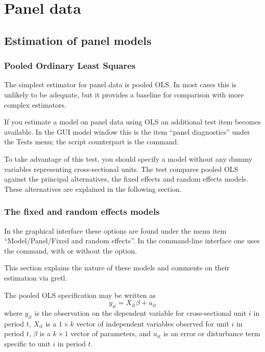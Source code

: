 \chapter{Panel data}
\label{chap:panel}

\section{Estimation of panel models}

\subsection{Pooled Ordinary Least Squares}
\label{pooled-est}

The simplest estimator for panel data is pooled OLS.  In most cases
this is unlikely to be adequate, but it provides a baseline for
comparison with more complex estimators.

If you estimate a model on panel data using OLS an additional test
item becomes available.  In the GUI model window this is the item
``panel diagnostics'' under the \textsf{Tests} menu; the script
counterpart is the  command.

To take advantage of this test, you should specify a model without any
dummy variables representing cross-sectional units.  The test compares
pooled OLS against the principal alternatives, the fixed effects and
random effects models.  These alternatives are explained in the
following section.

\subsection{The fixed and random effects models}
\label{sec:FE-vs-RE}

In the graphical interface these options are found under the menu item
``Model/Panel/Fixed and random effects''.  In the command-line
interface one uses the  command, with or without the
 option.

This section explains the nature of these models and comments on their
estimation via gretl.

The pooled OLS specification may be written as 
\begin{equation}
\label{eq:pooled}
y_{it} = X_{it}\beta + u_{it}
\end{equation}
where $y_{it}$ is the observation on the dependent variable for
cross-sectional unit $i$ in period $t$, $X_{it}$ is a $1\times k$
vector of independent variables observed for unit $i$ in period $t$,
$\beta$ is a $k\times 1$ vector of parameters, and $u_{it}$ is an error
or disturbance term specific to unit $i$ in period $t$.


